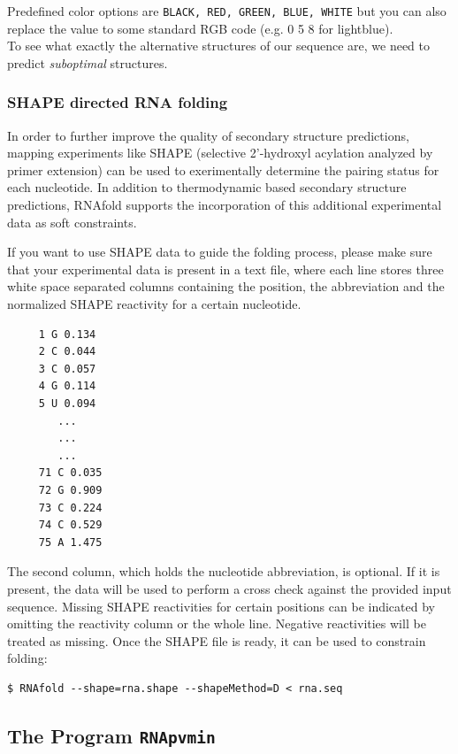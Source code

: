 \documentclass[a4paper]{article}
\newcommand{\frametitle}[1]{\subsubsection{#1}}
\begin{document}
Predefined color options are \texttt{BLACK, RED, GREEN, BLUE, WHITE} but you can also 
replace the value to some standard RGB code (e.g. 0 5 8 for lightblue).\\

To see what exactly the alternative structures of our sequence are, we need
to predict \emph{suboptimal} structures.

\frametitle{SHAPE directed RNA folding}

In order to further improve the quality of secondary structure predictions, mapping experiments like
SHAPE (selective 2'-hydroxyl acylation analyzed by primer extension) can be used to exerimentally determine
the pairing status for each nucleotide.
In addition to thermodynamic based secondary structure predictions, RNAfold supports the incorporation of this additional
experimental data as soft constraints.

If you want to use SHAPE data to guide the folding process, please make sure that your experimental data is present in a text file,
where each line stores three white space separated columns containing the position, the abbreviation and the normalized SHAPE reactivity for
a certain nucleotide.

\begin{verbatim}
     1 G 0.134
     2 C 0.044
     3 C 0.057
     4 G 0.114
     5 U 0.094
        ...
        ...
        ...
     71 C 0.035
     72 G 0.909
     73 C 0.224
     74 C 0.529
     75 A 1.475
\end{verbatim}%

The second column, which holds the nucleotide abbreviation, is optional.
If it is present, the data will be used to perform a cross check against the provided input sequence.
Missing SHAPE reactivities for certain positions can be indicated by omitting the reactivity column or the whole line.
Negative reactivities will be treated as missing.
Once the SHAPE file is ready, it can be used to constrain folding:

\begin{verbatim}
$ RNAfold --shape=rna.shape --shapeMethod=D < rna.seq
\end{verbatim}%


\pagebreak[3]
\subsection{The Program \texttt{RNApvmin}}
\end{document}
